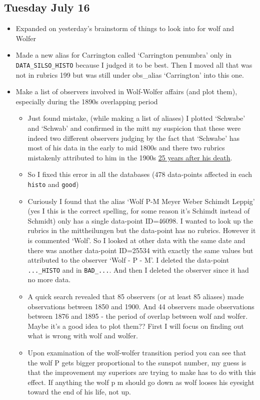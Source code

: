 \documentclass[12pt]{article}
\begin{document}
\subsection{Tuesday July 16}
\begin{itemize}
    \item Expanded on yesterday's brainstorm of things to look into for wolf and Wolfer
    \item Made a new alias for Carrington called `Carrington penumbra' only in \texttt{DATA\_SILSO\_HISTO} because I judged it to be best. Then I moved all that was not in rubrics 199 but was still under obs\_alias `Carrington' into this one.
    \item Make a list of observers involved in Wolf-Wolfer affairs (and plot them), especially during the 1890s overlapping period
    \begin{itemize}
        \item Just found mistake, (while making a list of aliases) I plotted `Schwabe' and `Schwab' and confirmed in the mitt my suspicion that these were indeed two different observers judging by the fact that `Schwabe' has most of his data in the early to mid 1800s and there two rubrics mistakenly attributed to him in the 1900s \href{https://en.wikipedia.org/wiki/Heinrich_Schwabe}{25 years after his death}.
        \item So I fixed this error in all the databases (478 data-points affected in each 
        \texttt{histo} and \texttt{good})
        \item Curiously I found that the alias `Wolf P-M Meyer Weber Schimdt Leppig' (yes I this is the correct spelling, for some reason it's Schimdt instead of Schmidt) only has a single data-point ID=46098. I wanted to look up the rubrics in the mittheilungen but the data-point has no rubrics. However it is commented `Wolf'. So I looked at other data with the same date and there was another data-point ID=25534 with exactly the same values but attributed to the observer `Wolf - P - M'. I deleted the data-point \texttt{...\_HISTO} and in \texttt{BAD\_...}. And then I deleted the observer since it had no more data. 
        \item A quick search revealed that 85 observers (or at least 85 aliases) made observations between 1850 and 1900. And 44 observers made observations between 1876 and 1895 - the period of overlap between wolf and wolfer. Maybe it's a good idea to plot them?? First I will focus on finding out what is wrong with wolf and wolfer.
        \item Upon examination of the wolf-wolfer transition period you can see that the wolf P gets bigger proportional to the sunspot number, my guess is that the improvement my superiors are trying to make has to do with this effect. If anything the wolf p m should go down as wolf looses his eyesight toward the end of his life, not up.

\end{itemize}
\end{itemize}
\end{document}
